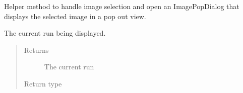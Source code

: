 \documentclass[letterpaper,10pt,english]{sphinxmanual}
\begin{document}
\begin{fulllineitems}
\begin{fulllineitems}
\begin{quote}
\begin{description}
\end{description}\end{quote}

\end{fulllineitems}


\begin{fulllineitems}
\label{\detokenize{polo.widgets:polo.widgets.plate_viewer.plateViewer.pop_out_selected_well}}
Helper method to handle image selection and open an ImagePopDialog
that displays the selected image in a pop out view.

\end{fulllineitems}


\begin{fulllineitems}
\label{\detokenize{polo.widgets:polo.widgets.plate_viewer.plateViewer.run}}
The current run being displayed.
\begin{quote}\begin{description}
\item[{Returns}] \leavevmode
The current run

\item[{Return type}] \leavevmode
{\hyperref[\detokenize{polo.crystallography:polo.crystallography.run.HWIRun}]{}}

\end{description}\end{quote}

\end{fulllineitems}



\end{fulllineitems}
\end{document}
